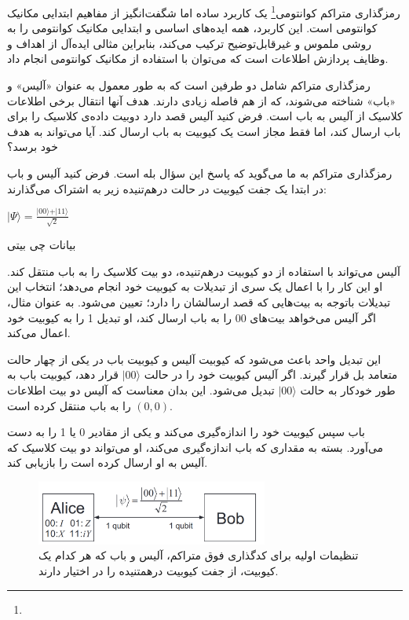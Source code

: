 \documentclass{book}
\begin{document}
رمزگذاری متراکم کوانتومی\footnote{} یک کاربرد ساده اما شگفت‌انگیز از مفاهیم ابتدایی مکانیک کوانتومی است. این کاربرد، همه ایده‌های اساسی و ابتدایی مکانیک کوانتومی را به روشی ملموس و غیرقابل‌توضیح ترکیب می‌کند، بنابراین مثالی ایده‌آل از اهداف و وظایف پردازش اطلاعات است که می‌توان با استفاده از مکانیک کوانتومی انجام داد.

رمزگذاری متراکم شامل دو طرفین است که به طور معمول به عنوان «آلیس» و «باب» شناخته می‌شوند، که از هم فاصله زیادی دارند. هدف آنها انتقال برخی اطلاعات کلاسیک از آلیس به باب است. فرض کنید آلیس قصد دارد دوبیت داده‌ی کلاسیک را برای باب ارسال کند، اما فقط مجاز است یک کیوبیت به باب ارسال کند. آیا می‌تواند به هدف خود برسد؟

رمزگذاری متراکم به ما می‌گوید که پاسخ این سؤال بله است. فرض کنید آلیس و باب در ابتدا یک جفت کیوبیت در حالت درهم‌تنیده زیر به اشتراک می‌گذارند:


\begin{center}
	$\vert \Psi \rangle = \frac{\vert 00 \rangle + \vert 11\rangle}{\sqrt{2}}$
\end{center}


بیانات چی بیتی


آلیس می‌تواند با استفاده از دو کیوبیت درهم‌تنیده، دو بیت کلاسیک را به باب منتقل کند. او این کار را با اعمال یک سری از تبدیلات به کیوبیت خود انجام می‌دهد؛ انتخاب این تبدیلات باتوجه به بیت‌هایی که قصد ارسالشان را دارد؛‌ تعیین می‌شود.  به عنوان مثال، اگر آلیس می‌خواهد بیت‌های 00 را به باب ارسال کند، او تبدیل 1 را به کیوبیت خود اعمال می‌کند.

این تبدیل واحد باعث می‌شود که کیوبیت آلیس و کیوبیت باب در یکی از چهار حالت متعامد بل قرار گیرند. اگر آلیس کیوبیت خود را در حالت $\vert 00 \rangle$ قرار دهد، کیوبیت باب به طور خودکار به حالت $\vert 00 \rangle$ تبدیل می‌شود. این بدان معناست که آلیس دو بیت اطلاعات $(0, 0)$ را به باب منتقل کرده است.

باب سپس کیوبیت خود را اندازه‌گیری می‌کند و یکی از مقادیر 0 یا 1 را به دست می‌آورد. بسته به مقداری که باب اندازه‌گیری می‌کند، او می‌تواند دو بیت کلاسیک که آلیس به او ارسال کرده است را بازیابی کند.
\pagebreak

\begin{center}
	\begin{figure}[htbp]
		\centering
		\includegraphics[width=3in]{super dence.png}
		\caption{تنظیمات اولیه برای کدگذاری فوق متراکم، آلیس و باب که هر کدام یک کیوبیت، از جفت کیوبیت درهمتنیده را در اختیار دارند.}
		\label{fig:myimage}
	\end{figure}
\end{center}
\end{document}
